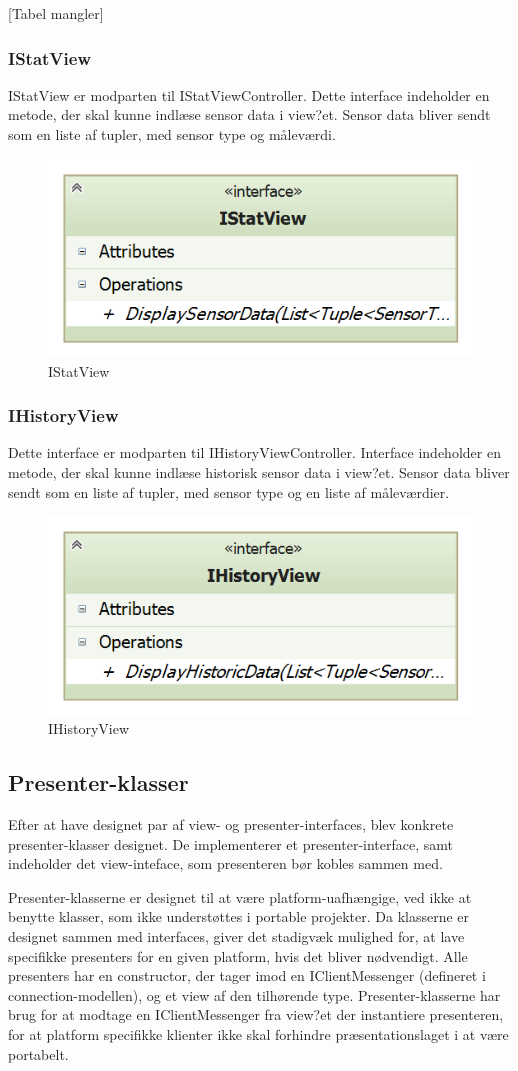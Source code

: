 [Tabel mangler]

\subsubsection{IStatView}
IStatView er modparten til IStatViewController. Dette interface indeholder en metode, der skal kunne indlæse sensor data i view?et. Sensor data bliver sendt som en liste af tupler, med sensor type og måleværdi.

\begin{figure}
	\centering
	\includegraphics[width=0.3\linewidth]{figs/design/application_istatview}
	\caption{IStatView}
	\label{fig:application_istatview}
\end{figure}

\subsubsection{IHistoryView}
Dette interface er modparten til IHistoryViewController. Interface indeholder en metode, der skal kunne indlæse historisk sensor data i view?et. Sensor data bliver sendt som en liste af tupler, med sensor type og en liste af måleværdier.

\begin{figure}
	\centering
	\includegraphics[width=0.3\linewidth]{figs/design/application_ihistoryview}
	\caption{IHistoryView}
	\label{fig:application_ihistoryview}
\end{figure}

\subsection{Presenter-klasser}
Efter at have designet par af view- og presenter-interfaces, blev konkrete presenter-klasser designet. De implementerer et presenter-interface, samt indeholder det view-inteface, som presenteren bør kobles sammen med.

Presenter-klasserne er designet til at være platform-uafhængige, ved ikke at benytte klasser, som ikke understøttes i portable projekter. Da klasserne er designet sammen med interfaces, giver det stadigvæk mulighed for, at lave specifikke presenters for en given platform, hvis det bliver nødvendigt. Alle presenters har en constructor, der tager imod en IClientMessenger (defineret i connection-modellen), og et view af den tilhørende type. Presenter-klasserne har brug for at modtage en IClientMessenger fra view?et der instantiere presenteren, for at platform specifikke klienter ikke skal forhindre præsentationslaget i at være portabelt. 

